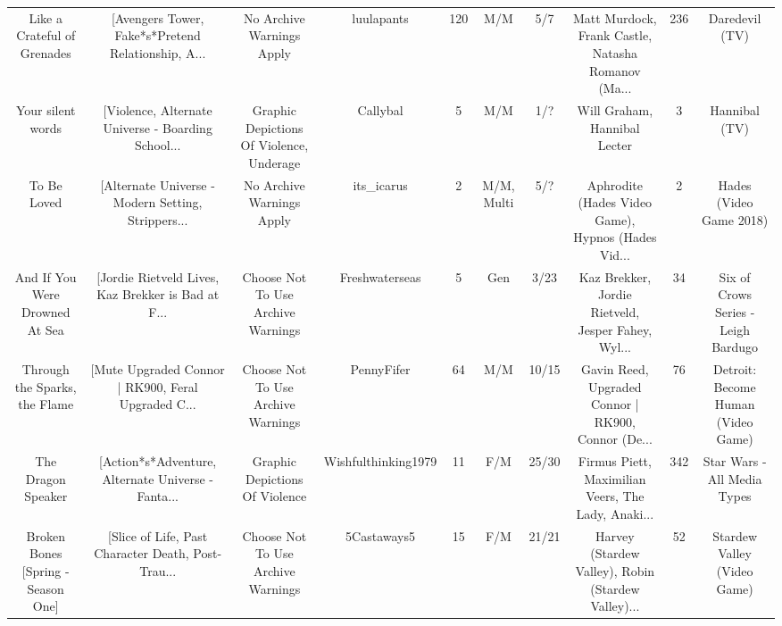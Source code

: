 \begin{table}[h!]
{\begin{tabular}{|c|c|c|c|c|c|c|c|c|c|}
                       Like a Crateful of Grenades & [Avengers Tower, Fake*s*Pretend Relationship, A... &                          No Archive Warnings Apply &                         luulapants &       120 &                              M/M &      5/7 & Matt Murdock, Frank Castle, Natasha Romanov (Ma... &      236 &                                     Daredevil (TV) \\
                                 Your silent words & [Violence, Alternate Universe - Boarding School... &           Graphic Depictions Of Violence, Underage &                           Callybal &         5 &                              M/M &      1/? &                       Will Graham, Hannibal Lecter &        3 &                                      Hannibal (TV) \\
                                       To Be Loved & [Alternate Universe - Modern Setting, Strippers... &                          No Archive Warnings Apply &                         its\_icarus &         2 &                       M/M, Multi &      5/? & Aphrodite (Hades Video Game), Hypnos (Hades Vid... &        2 &                            Hades (Video Game 2018) \\
                    And If You Were Drowned At Sea & [Jordie Rietveld Lives, Kaz Brekker is Bad at F... &                 Choose Not To Use Archive Warnings &                     Freshwaterseas &         5 &                              Gen &     3/23 & Kaz Brekker, Jordie Rietveld, Jesper Fahey, Wyl... &       34 &                Six of Crows Series - Leigh Bardugo \\
                     Through the Sparks, the Flame & [Mute Upgraded Connor | RK900, Feral Upgraded C... &                 Choose Not To Use Archive Warnings &                         PennyFifer &        64 &                              M/M &    10/15 & Gavin Reed, Upgraded Connor | RK900, Connor (De... &       76 &                 Detroit: Become Human (Video Game) \\
                                The Dragon Speaker & [Action*s*Adventure, Alternate Universe - Fanta... &                     Graphic Depictions Of Violence &                Wishfulthinking1979 &        11 &                              F/M &    25/30 & Firmus Piett, Maximilian Veers, The Lady, Anaki... &      342 &                        Star Wars - All Media Types \\
                Broken Bones [Spring - Season One] & [Slice of Life, Past Character Death, Post-Trau... &                 Choose Not To Use Archive Warnings &                        5Castaways5 &        15 &                              F/M &    21/21 & Harvey (Stardew Valley), Robin (Stardew Valley)... &       52 &                        Stardew Valley (Video Game) \\

\end{tabular}}
\end{table}
